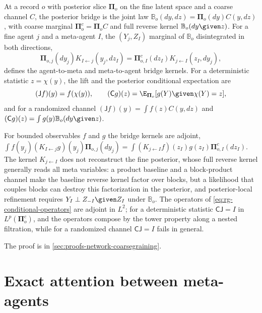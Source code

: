 At a record $o$ with posterior slice $\boldsymbol\Pi_o$ on the fine latent space and
a coarse channel $C$, the posterior bridge is the joint law
$\mathbb B_o(dy,dz)=\boldsymbol\Pi_o(dy)C(y,dz)$, with coarse marginal
$\boldsymbol\Pi^c_o=\boldsymbol\Pi_oC$ and full reverse kernel
$\mathbb B_o(dy\given z)$. For a fine agent $j$ and a meta-agent $I$, the
$(Y_j,Z_I)$ marginal of $\mathbb B_o$ disintegrated in both directions,
\begin{equation}
\boldsymbol\Pi_{o,j}(dy_j)K_{I\leftarrow j}(y_j,dz_I)
=\boldsymbol\Pi^c_{o,I}(dz_I)K_{j\leftarrow I}(z_I,dy_j),
\label{eq:rg-agent-meta-bayes-adjoint}
\end{equation}
defines the agent-to-meta and meta-to-agent bridge kernels. For a deterministic
statistic $z=\chi(y)$, the lift and the posterior conditional expectation are
\begin{equation}
(\mathsf Jf)(y)=f(\chi(y)),
\qquad
(\mathsf Cg)(z)=\E_{\boldsymbol\Pi_o}[g(Y)\given\chi(Y)=z],
\label{eq:rg-conditional-operators}
\end{equation}
and for a randomized channel $(\mathsf Jf)(y)=\int f(z)C(y,dz)$ and
$(\mathsf Cg)(z)=\int g(y)\mathbb B_o(dy\given z)$.

For bounded observables $f$ and $g$ the bridge kernels are adjoint,
$\int f(y_j)(K_{I\leftarrow j}g)(y_j)\boldsymbol\Pi_{o,j}(dy_j)
=\int(K_{j\leftarrow I}f)(z_I)g(z_I)\boldsymbol\Pi^c_{o,I}(dz_I)$. The kernel
$K_{j\leftarrow I}$ does not reconstruct the fine posterior, whose full reverse
kernel generally reads all meta variables: a product baseline and a block-product
channel make the baseline reverse kernel factor over blocks, but a likelihood that
couples blocks can destroy this factorization in the posterior, and
posterior-local refinement requires $Y_I\perp Z_{-I}\given Z_I$ under
$\mathbb B_o$. The operators of \eqref{eq:rg-conditional-operators} are adjoint in
$L^2$; for a deterministic statistic $\mathsf C\mathsf J=I$ in
$L^p(\boldsymbol\Pi^c_o)$, and the operators compose by the tower property along a
nested filtration, while for a randomized channel $\mathsf C\mathsf J=I$ fails in
general. 

The proof is in \cref{sec:proofs-network-coarsegraining}.

\section{Exact attention between meta-agents}
\label{sec:rg-meta-attention}

